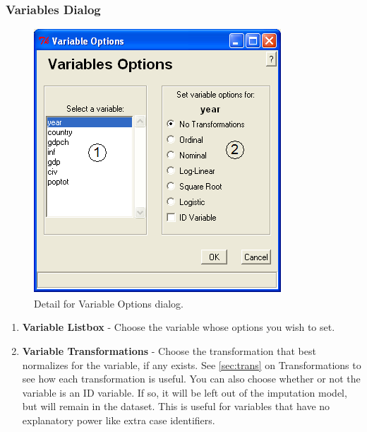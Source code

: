 \documentclass[12pt,titlepage]{article}
\begin{document}
\subsubsection{Variables Dialog}
\label{sec:vardiag}
\begin{figure}[ht]
  \centering \includegraphics[scale=.75]{varopts.png}
  \caption{Detail for Variable Options dialog.}
\end{figure}
\begin{enumerate}
\item \textbf{Variable Listbox} - Choose the variable whose options
  you wish to set.
\item \textbf{Variable Transformations} - Choose the transformation
  that best normalizes for the variable, if any exists.  See
  \ref{sec:trans} on Transformations to see how each transformation is
  useful.  You can also choose whether or not the variable is an ID
  variable.  If so, it will be left out of the imputation model, but
  will remain in the dataset.  This is useful for variables that have
  no explanatory power like extra case identifiers.
\end{enumerate}
\end{document}
